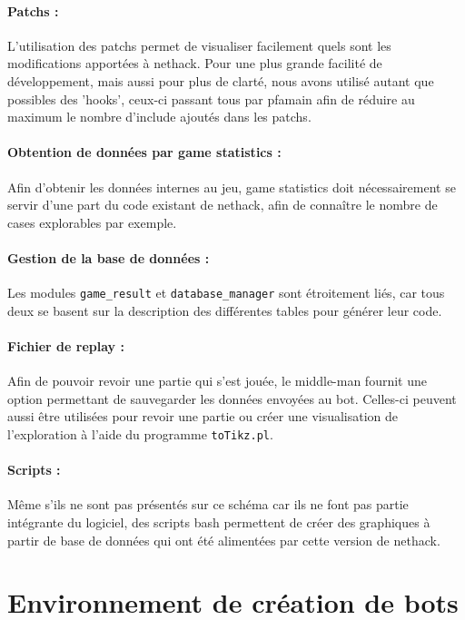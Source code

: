 \documentclass[a4paper,12pt]{article}
\begin{document}
\paragraph{Patchs :}
L'utilisation des patchs permet de visualiser facilement quels sont les
modifications apportées à nethack. Pour une plus grande facilité de
développement, mais aussi pour plus de clarté, nous avons utilisé autant que
possibles des 'hooks', ceux-ci passant tous par pfamain afin de réduire au
maximum le nombre d'include ajoutés dans les patchs.

\paragraph{Obtention de données par game statistics :}
Afin d'obtenir les données internes au jeu, game statistics doit nécessairement
se servir d'une part du code existant de nethack, afin de connaître le nombre de
cases explorables par exemple.

\paragraph{Gestion de la base de données :}
Les modules {\verb|game_result|} et {\verb|database_manager|} sont étroitement
liés, car tous deux se basent sur la description des différentes tables pour
générer leur code.

\paragraph{Fichier de replay :}
Afin de pouvoir revoir une partie qui s'est jouée, le middle-man fournit une
option permettant de sauvegarder les données envoyées au bot. Celles-ci
peuvent aussi être utilisées pour revoir une partie ou créer une
visualisation de l'exploration à l'aide du programme {\verb|toTikz.pl|}.

\paragraph{Scripts :}
Même s'ils ne sont pas présentés sur ce schéma car ils ne font pas partie
intégrante du logiciel, des scripts bash permettent de créer des graphiques à
partir de base de données qui ont été alimentées par cette version de nethack.


\section{Environnement de création de bots}
\end{document}
